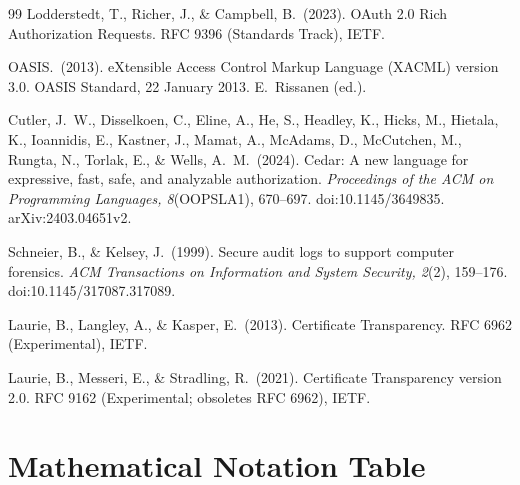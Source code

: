 \documentclass[10pt,twocolumn]{article}
\begin{document}
\begin{thebibliography}{99}
Lodderstedt, T., Richer, J., \& Campbell, B.\ (2023).
OAuth 2.0 Rich Authorization Requests.
RFC 9396 (Standards Track), IETF.

OASIS.\ (2013).
eXtensible Access Control Markup Language (XACML) version 3.0.
OASIS Standard, 22 January 2013. E.~Rissanen (ed.).

Cutler, J.~W., Disselkoen, C., Eline, A., He, S., Headley, K., Hicks, M.,
Hietala, K., Ioannidis, E., Kastner, J., Mamat, A., McAdams, D.,
McCutchen, M., Rungta, N., Torlak, E., \& Wells, A.~M.\ (2024).
Cedar: A new language for expressive, fast, safe, and analyzable
authorization.
\emph{Proceedings of the ACM on Programming Languages, 8}(OOPSLA1),
670--697. doi:10.1145/3649835. arXiv:2403.04651v2.

Schneier, B., \& Kelsey, J.\ (1999).
Secure audit logs to support computer forensics.
\emph{ACM Transactions on Information and System Security, 2}(2),
159--176. doi:10.1145/317087.317089.

Laurie, B., Langley, A., \& Kasper, E.\ (2013).
Certificate Transparency.
RFC 6962 (Experimental), IETF.

Laurie, B., Messeri, E., \& Stradling, R.\ (2021).
Certificate Transparency version 2.0.
RFC 9162 (Experimental; obsoletes RFC 6962), IETF.

\end{thebibliography}

\appendix

\section{Mathematical Notation Table}
\label{app:math}
\end{document}

